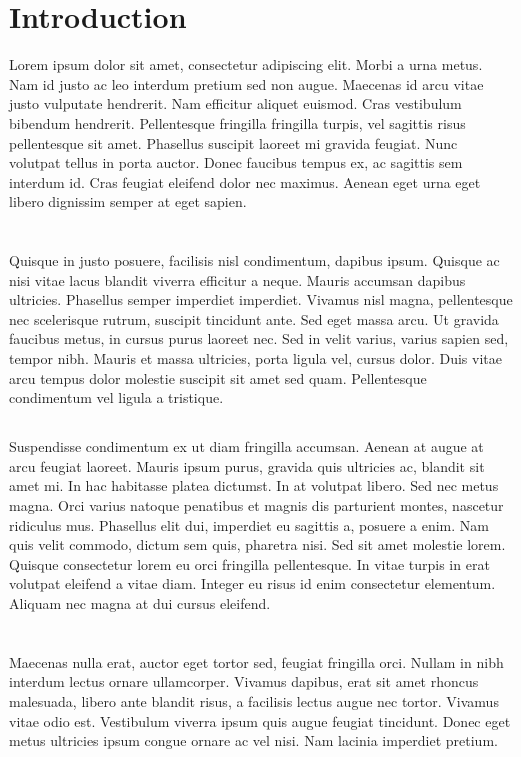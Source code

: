 \section{Introduction}
Lorem ipsum dolor sit amet, consectetur adipiscing elit. Morbi a urna metus. Nam id justo ac leo interdum pretium sed non augue. Maecenas id arcu vitae justo vulputate hendrerit. Nam efficitur aliquet euismod. Cras vestibulum bibendum hendrerit. Pellentesque fringilla fringilla turpis, vel sagittis risus pellentesque sit amet. Phasellus suscipit laoreet mi gravida feugiat. Nunc volutpat tellus in porta auctor. Donec faucibus tempus ex, ac sagittis sem interdum id. Cras feugiat eleifend dolor nec maximus. Aenean eget urna eget libero dignissim semper at eget sapien.

\section{}
Quisque in justo posuere, facilisis nisl condimentum, dapibus ipsum. Quisque ac nisi vitae lacus blandit viverra efficitur a neque. Mauris accumsan dapibus ultricies. Phasellus semper imperdiet imperdiet. Vivamus nisl magna, pellentesque nec scelerisque rutrum, suscipit tincidunt ante. Sed eget massa arcu. Ut gravida faucibus metus, in cursus purus laoreet nec. Sed in velit varius, varius sapien sed, tempor nibh. Mauris et massa ultricies, porta ligula vel, cursus dolor. Duis vitae arcu tempus dolor molestie suscipit sit amet sed quam. Pellentesque condimentum vel ligula a tristique.

\subsection{}
Suspendisse condimentum ex ut diam fringilla accumsan. Aenean at augue at arcu feugiat laoreet. Mauris ipsum purus, gravida quis ultricies ac, blandit sit amet mi. In hac habitasse platea dictumst. In at volutpat libero. Sed nec metus magna. Orci varius natoque penatibus et magnis dis parturient montes, nascetur ridiculus mus. Phasellus elit dui, imperdiet eu sagittis a, posuere a enim. Nam quis velit commodo, dictum sem quis, pharetra nisi. Sed sit amet molestie lorem. Quisque consectetur lorem eu orci fringilla pellentesque. In vitae turpis in erat volutpat eleifend a vitae diam. Integer eu risus id enim consectetur elementum. Aliquam nec magna at dui cursus eleifend.

\section{}
Maecenas nulla erat, auctor eget tortor sed, feugiat fringilla orci. Nullam in nibh interdum lectus ornare ullamcorper. Vivamus dapibus, erat sit amet rhoncus malesuada, libero ante blandit risus, a facilisis lectus augue nec tortor. Vivamus vitae odio est. Vestibulum viverra ipsum quis augue feugiat tincidunt. Donec eget metus ultricies ipsum congue ornare ac vel nisi. Nam lacinia imperdiet pretium.

